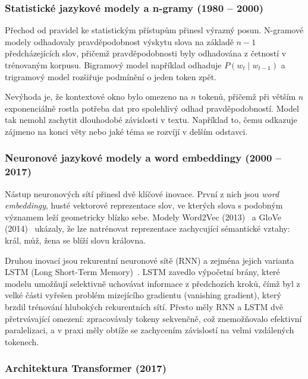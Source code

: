 \subsubsection*{Statistické jazykové modely a n-gramy (1980 -- 2000)}
\label{subsubsec:llm-history-statistical}

Přechod od pravidel ke statistickým přístupům přinesl výrazný posun.
N-gramové modely odhadovaly pravděpodobnost výskytu slova na základě $n-1$ předcházejících slov, přičemž pravděpodobnosti byly odhadována z četností v trénovaným korpusu.
Bigramový model například odhaduje $P(w_t \mid w_{t-1})$ a trigramový model rozšiřuje podmínění o jeden token zpět.

Nevýhoda je, že kontextové okno bylo omezeno na $n$ tokenů, přičemž při větším $n$ exponenciálně rostla potřeba dat pro spolehlivý odhad pravděpodobností.
Model tak nemohl zachytit dlouhodobé závislosti v textu.
Například to, čemu odkazuje zájmeno na konci věty nebo jaké téma se rozvíjí v delším odstavci.

\subsubsection*{Neuronové jazykové modely a word embeddingy (2000 -- 2017)}
\label{subsubsec:llm-history-neural}

Nástup neuronových sítí přinesl dvě klíčové inovace.
První z nich jsou \textit{word embeddingy}, husté vektorové reprezentace slov, ve kterých slova s podobným významem leží geometricky blízko sebe.
Modely Word2Vec (2013)~\cite{mikolov-word2vec} a GloVe (2014)~\cite{pennington-glove} ukázaly, že lze natrénovat reprezentace zachycující sémantické vztahy: král, můž, žena se blíží slovu královna.

Druhou inovací jsou rekurentní neuronové sítě (RNN) a zejména jejich varianta LSTM (Long Short-Term Memory)~\cite{hochreiter-lstm}.
LSTM zavedlo výpočetní brány, které modelu umožňují selektivně uchovávat informace z předchozích kroků, čímž byl z velké části vyřešen problém mizejícího gradientu (vanishing gradient), který brzdil trénování hlubokých rekurentních sítí.
Přesto měly RNN a LSTM dvě přetrvávající omezení: zpracovávaly tokeny sekvenčně, což znemožňovalo efektivní paralelizaci, a v praxi měly obtíže se zachycením závislostí na velmi vzdálených tokenech.

\subsubsection*{Architektura Transformer (2017)}
\label{subsubsec:llm-history-transformer}

